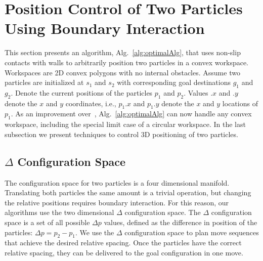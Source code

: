 

\section{Position Control of Two Particles Using Boundary Interaction}\label{sec:PostionControl2Robots}

This section presents an algorithm, Alg.~\ref{alg:optimalAlg}, that uses non-slip contacts with walls to arbitrarily position two particles in a convex workspace. 
 Workspaces are 2D convex polygons with no internal obstacles. 
 Assume two particles are initialized at $s_1$ and $s_2$ with corresponding goal destinations $g_1$ and $g_2$. 
 Denote the current positions of the particles  $p_1$ and $p_2$. Values $.x$ and $.y$ denote the $x$ and $y$ coordinates, i.e., $p_1.x$ and $p_1.y$ denote the $x$ and $y$ locations of $p_1$. 
  As an improvement over~\cite{shahrokhi2017algorithms}, Alg.~\ref{alg:optimalAlg} can now handle any convex workspace, including the special limit case of a circular workspace. In the last subsection we present techniques to control 3D positioning of two particles.



\subsection{$\Delta$ Configuration Space}
The configuration space for two particles is a four dimensional manifold. Translating both particles the same amount is a trivial operation, but changing the relative positions requires boundary interaction. For this reason, our algorithms use the two dimensional $\Delta$ configuration space.
The $\Delta$ configuration space is a set of all possible $\Delta p$ values, defined as the difference in position of the particles: $\Delta p = p_2 - p_1$.
We use the $\Delta$ configuration space to plan move sequences that achieve the desired relative spacing.  Once the particles have the correct relative spacing, they can be delivered to the goal configuration in one move.

